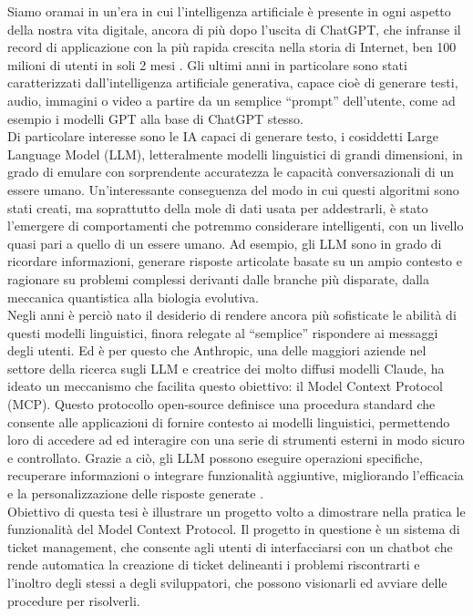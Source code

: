﻿Siamo oramai in un'era in cui l'intelligenza artificiale è presente in ogni aspetto della nostra vita digitale,
ancora di più dopo l'uscita di ChatGPT, che infranse il record di applicazione con la più rapida crescita nella storia di Internet,
ben 100 milioni di utenti in soli 2 mesi \cite{ubs2023latest}. Gli ultimi anni in particolare sono stati caratterizzati dall'intelligenza
artificiale generativa, capace cioè di generare testi, audio, immagini o video a partire da un semplice “prompt” dell'utente, come ad esempio i
modelli GPT alla base di ChatGPT stesso. \\
Di particolare interesse sono le IA capaci di generare testo, i cosiddetti Large Language Model (LLM), letteralmente modelli linguistici
di grandi dimensioni, in grado di emulare con sorprendente accuratezza le capacità conversazionali di un essere umano. Un'interessante
conseguenza del modo in cui questi algoritmi sono stati creati, ma soprattutto della mole di dati usata per addestrarli, è stato l'emergere
di comportamenti che potremmo considerare intelligenti, con un livello quasi pari a quello di un essere umano. Ad esempio, gli LLM sono
in grado di ricordare informazioni, generare risposte articolate basate su un ampio contesto e ragionare su problemi complessi derivanti
dalle branche più disparate, dalla meccanica quantistica alla biologia evolutiva. \\
Negli anni è perciò nato il desiderio di rendere ancora più sofisticate le abilità di questi modelli linguistici, finora relegate al
“semplice” rispondere ai messaggi degli utenti. Ed è per questo che Anthropic, una delle maggiori aziende nel settore della ricerca sugli LLM
e creatrice dei molto diffusi modelli Claude, ha ideato un meccanismo che facilita questo obiettivo: il Model Context Protocol (MCP).
Questo protocollo open-source definisce una procedura standard che consente alle applicazioni di fornire contesto ai modelli linguistici,
permettendo loro di accedere ad ed interagire con una serie di strumenti esterni in modo sicuro e controllato. Grazie a ciò, gli LLM possono
eseguire operazioni specifiche, recuperare informazioni o integrare funzionalità aggiuntive, migliorando l'efficacia e la personalizzazione
delle risposte generate \cite{modelcontextprotocol2024}. \\
Obiettivo di questa tesi è illustrare un progetto volto a dimostrare nella pratica le funzionalità del Model Context Protocol. Il progetto
in questione è un sistema di ticket management, che consente agli utenti di interfacciarsi con un chatbot che rende automatica la creazione
di ticket delineanti i problemi riscontrarti e l'inoltro degli stessi a degli sviluppatori, che possono visionarli ed avviare delle procedure
per risolverli.
